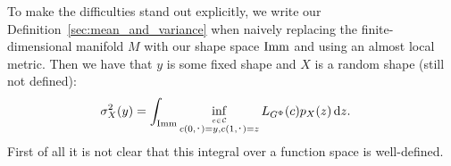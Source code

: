 To make the difficulties stand out explicitly, we write our Definition~\ref{sec:mean_and_variance} when naively replacing the finite-dimensional manifold $M$ with our shape space $\mathop{}\!\mathrm{Imm}$ and using an almost local metric. Then we have that $y$ is some fixed shape and $X$ is a random shape (still not defined):
\begin{align*}
  \sigma^2_X(y) &  = \int_{\I}
                  \inf_{\stackrel{c \in \mathcal{C}}{c(0,\blank)=y, c(1,\blank)=z}}
                  L_{G^\Phi}(c)p_X(z)
                  \diff z
  .
\end{align*}
First of all it is not clear that this integral over a function space is well-defined.


